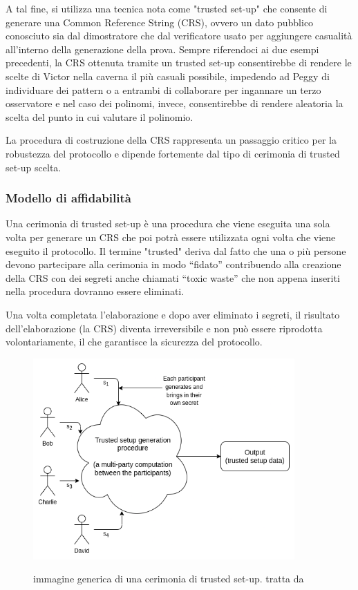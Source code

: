 A tal fine, si utilizza una tecnica nota come "trusted set-up" che consente di generare una Common Reference String
(CRS), ovvero un dato pubblico conosciuto sia dal dimostratore che dal verificatore usato per aggiungere casualità
all’interno della generazione della prova. Sempre riferendoci ai due esempi precedenti, la CRS ottenuta tramite un
trusted set-up consentirebbe di rendere le scelte di Victor nella caverna il più casuali possibile, impedendo ad Peggy
di individuare dei pattern o a entrambi di collaborare per ingannare un terzo osservatore e nel caso dei polinomi,
invece, consentirebbe di rendere aleatoria la scelta del punto in cui valutare il polinomio. 

La procedura di costruzione della CRS rappresenta un passaggio critico per la robustezza del protocollo e dipende
fortemente dal tipo di cerimonia di trusted set-up scelta.

\subsubsection{Modello di affidabilità}

Una cerimonia di trusted set-up è una procedura che viene eseguita una sola volta per generare un CRS che poi potrà
essere utilizzata ogni volta che viene eseguito il protocollo. Il termine "trusted" deriva dal fatto che una o più
persone devono partecipare alla cerimonia in modo “fidato” contribuendo alla creazione della CRS con dei segreti anche
chiamati “toxic waste” che non appena inseriti nella procedura dovranno essere eliminati. \clearpage

Una volta completata l'elaborazione e dopo aver eliminato i segreti, il risultato dell'elaborazione (la CRS) diventa
irreversibile e non può essere riprodotta volontariamente, il che garantisce la sicurezza del protocollo.
\begin{figure}[H]
    \centering
    \includegraphics[width=10cm]{./chapters/1.state-of-art/images/11.trusted_setups.png}
    \label{fig:trusted_setups}
    \captionsetup{justification=centering}
    \caption{immagine generica di una cerimonia di trusted set-up. tratta da \cite{how-do-trusted-setups-work}}
\end{figure}

